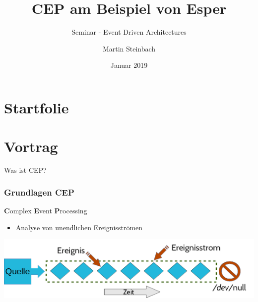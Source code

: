 \documentclass{beamer}
\title{CEP am Beispiel von Esper}
\subtitle{\scriptsize Seminar - Event Driven Architectures}
\institute{}
\author{Martin Steinbach}
\date{Januar 2019}
\begin{document}
\part{Startfolie}
\begin{frame}
\titlepage
\end{frame}




\part{Vortrag}
\begin{frame}{}
    \begin{center}
        \Large Was ist CEP?
    \end{center}
\end{frame}
\section{Grundlagen CEP}


\begin{frame}{\textbf{C}omplex \textbf{E}vent \textbf{P}rocessing}

\begin{exampleblock}{}
    \begin{itemize}
        \item  Analyse von unendlichen Ereignisströmen  
    \end{itemize}
\end{exampleblock}

\begin{center}
   \includegraphics[scale=0.4]{img/01_cep}
\end{center}


\end{frame}
\end{document}
